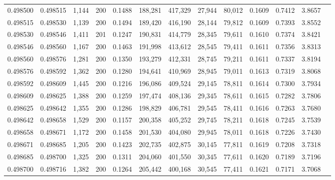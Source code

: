 \begin{tabular}{rrrrrrrrrrrrr}
0.498500 & 0.498515 & 1,144 & 200 &                                     0.1488 & 188,281 & 417,329 &  27,944 &  80,012 & 0.1609 & 0.7412 & 3.8657 \\
0.498515 & 0.498530 & 1,139 & 200 &                                     0.1494 & 189,420 & 416,190 &  28,144 &  79,812 & 0.1609 & 0.7393 & 3.8552 \\
0.498530 & 0.498546 & 1,411 & 201 &                                     0.1247 & 190,831 & 414,779 &  28,345 &  79,611 & 0.1610 & 0.7374 & 3.8421 \\
0.498546 & 0.498560 & 1,167 & 200 &                                     0.1463 & 191,998 & 413,612 &  28,545 &  79,411 & 0.1611 & 0.7356 & 3.8313 \\
0.498560 & 0.498576 & 1,281 & 200 &                                     0.1350 & 193,279 & 412,331 &  28,745 &  79,211 & 0.1611 & 0.7337 & 3.8194 \\
0.498576 & 0.498592 & 1,362 & 200 &                                     0.1280 & 194,641 & 410,969 &  28,945 &  79,011 & 0.1613 & 0.7319 & 3.8068 \\
0.498592 & 0.498609 & 1,445 & 200 &                                     0.1216 & 196,086 & 409,524 &  29,145 &  78,811 & 0.1614 & 0.7300 & 3.7934 \\
0.498609 & 0.498625 & 1,388 & 200 &                                     0.1259 & 197,474 & 408,136 &  29,345 &  78,611 & 0.1615 & 0.7282 & 3.7806 \\
0.498625 & 0.498642 & 1,355 & 200 &                                     0.1286 & 198,829 & 406,781 &  29,545 &  78,411 & 0.1616 & 0.7263 & 3.7680 \\
0.498642 & 0.498658 & 1,529 & 200 &                                     0.1157 & 200,358 & 405,252 &  29,745 &  78,211 & 0.1618 & 0.7245 & 3.7539 \\
0.498658 & 0.498671 & 1,172 & 200 &                                     0.1458 & 201,530 & 404,080 &  29,945 &  78,011 & 0.1618 & 0.7226 & 3.7430 \\
0.498671 & 0.498685 & 1,205 & 200 &                                     0.1423 & 202,735 & 402,875 &  30,145 &  77,811 & 0.1619 & 0.7208 & 3.7318 \\
0.498685 & 0.498700 & 1,325 & 200 &                                     0.1311 & 204,060 & 401,550 &  30,345 &  77,611 & 0.1620 & 0.7189 & 3.7196 \\
0.498700 & 0.498716 & 1,382 & 200 &                                     0.1264 & 205,442 & 400,168 &  30,545 &  77,411 & 0.1621 & 0.7171 & 3.7068 \\

\end{tabular}
